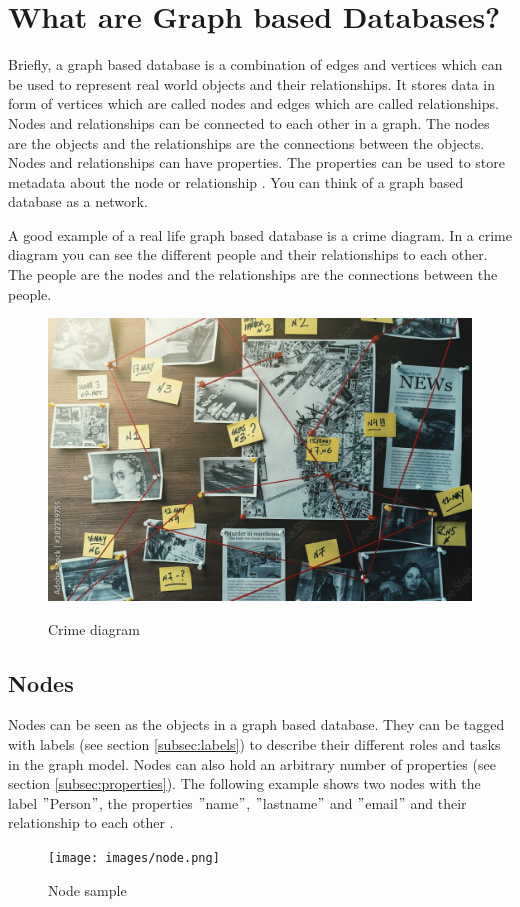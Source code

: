 \usepackage{biblatex}%

\section{What are Graph based Databases?}
Briefly, a graph based database is a combination of edges and vertices which  can be used to represent real world
objects and their relationships.
It stores data in form of vertices which are called nodes and edges which are called relationships.
Nodes and relationships can be connected to each other in a graph.
The nodes are the objects and the relationships are the connections between the objects.
Nodes and relationships can have properties.
The properties can be used to store metadata about the node or relationship \parencite[P. 6f.]{PractivalNeo4j}.
You can think of a graph based database as a network.

A good example of a real life graph based database is a crime diagram.
In a crime diagram you can see the different people and their relationships to each other.
The people are the nodes and the relationships are the connections between the people. \parencite[compare P. 6f.]{BeginningNeo4j}
\begin{figure}[h]
    \centering
    \includegraphics[width=1\textwidth]{images/crimediagramm.png}
    \caption{Crime diagram} \parencite{Neo4j:crimdiagram}
    \label{fig:crimeDiagram}
\end{figure}
\subsection{Nodes}
Nodes can be seen as the objects in a graph based database.
They can be tagged with labels (see section \ref{subsec:labels}) to describe their different roles and tasks in the graph model.
Nodes can also hold an arbitrary number of properties (see section \ref{subsec:properties}).
The following example shows two nodes with the label \("\)Person\("\), the properties \("\)name\("\), \("\)lastname\("\)
and \("\)email\("\) and their relationship to each other \parencite[compare P. 6f.]{PractivalNeo4j}.
\begin{figure}[!h]
    \centering
    \texttt{[image: images/node.png]}
    \caption{Node sample} \label{img:cypher}
\end{figure}
